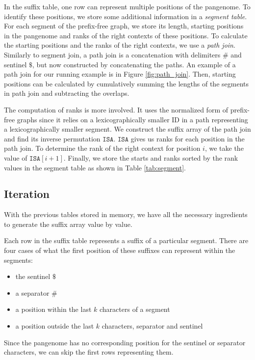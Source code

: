 In the suffix table, one row can represent multiple positions of the pangenome.
To identify these positions, we store some additional information in a \emph{segment table}.
For each segment of the prefix-free graph, we store its length, starting positions in the pangenome and ranks of the right contexts of these positions.
To calculate the starting positions and the ranks of the right contexts, we use a \emph{path join}.
Similarly to segment join, a path join is a concatenation with delimiters $\texttt{\#}$ and sentinel $\texttt{\$}$, but now constructed by concatenating the paths.
An example of a path join for our running example is in Figure \ref{fig:path_join}.
Then, starting positions can be calculated by cumulatively summing the lengths of the segments in path join and subtracting the overlaps.

The computation of ranks is more involved.
It uses the normalized form of prefix-free graphs since it relies on a lexicographically smaller ID in a path representing a lexicographically smaller segment.
We construct the suffix array of the path join and find its inverse permutation $\texttt{ISA}$.
$\texttt{ISA}$ gives us ranks for each position in the path join.
To determine the rank of the right context for position $i$, we take
the value of $\texttt{ISA}[i+1]$.
Finally, we store the starts and ranks sorted by the rank values in the segment table as shown in Table \ref{tab:segment}.

\subsection{Iteration}
With the previous tables stored in memory, we have all the necessary ingredients to generate the suffix array value by value.

Each row in the suffix table represents a suffix of a particular segment.
There are four cases of what the first position of these suffixes can represent within the segments:
\begin{itemize}
    \item the sentinel $\texttt{\$}$
    \item a separator $\texttt{\#}$
    \item a position within the last $k$ characters of a segment
    \item a position outside the last $k$ characters, separator and sentinel
\end{itemize}

Since the pangenome has no corresponding position for the sentinel or separator characters, we can skip the first rows representing them.

